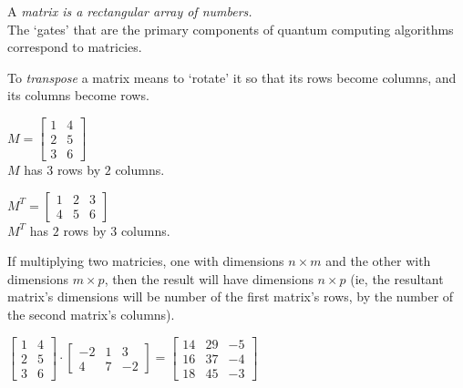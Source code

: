 \begin{definition}
    A \emph{matrix is a rectangular array of numbers.}\\
    The `gates' that are the primary components of quantum computing algorithms correspond to matricies.
\end{definition}

\begin{definition}
    To \emph{transpose} a matrix means to `rotate' it so that its rows become columns, and its columns become rows.
\end{definition}

\begin{example}
    $M = \begin{bmatrix}
        1 & 4\\
        2 & 5\\
        3 & 6
    \end{bmatrix}$\\
    $M$ has $3$ rows by $2$ columns.

    $M^T = \begin{bmatrix}
        1 & 2 & 3\\
        4 & 5 & 6
    \end{bmatrix}$\\
    $M^T$ has $2$ rows by $3$ columns.
\end{example}

If multiplying two matricies, one with dimensions $n \times m$ and the other with dimensions $m \times p$, then the result will have dimensions $n \times p$ (ie, the resultant matrix's dimensions will be number of the first matrix's rows, by the number of the second matrix's columns).

\begin{example}
    $
    \begin{bmatrix}
        1 & 4\\
        2 & 5\\
        3 & 6
    \end{bmatrix}
    \cdot
    \begin{bmatrix}
        -2 & 1 & 3\\
        4 & 7 & -2
    \end{bmatrix}
    =
    \begin{bmatrix}
        14 & 29 & -5\\
        16 & 37 & -4\\
        18 & 45 & -3
    \end{bmatrix}
    $
\end{example}

